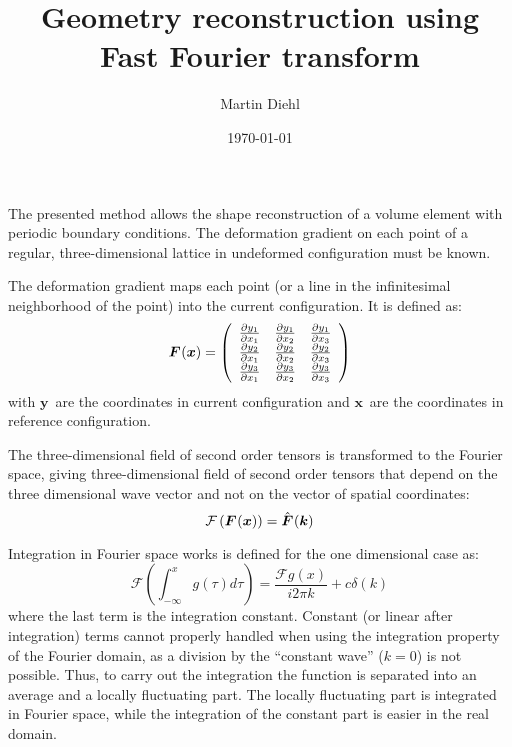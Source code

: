 \documentclass[a4paper,12pt]{article}
\title{Geometry reconstruction using Fast Fourier transform}
\date{\today}
\author{Martin Diehl}
\newcommand{\tnsr}[1]{\ensuremath{\bm{{#1}}}}
\newcommand{\vctr}[1]{\ensuremath{\bm{#1}}}
\newcommand{\F}[1][]{\ensuremath{\tnsr F^{{\rm #1}}}}
\begin{document}
\maketitle

The presented method allows the shape reconstruction of a volume element with periodic boundary conditions.
The deformation gradient on each point of a regular, three-dimensional lattice in undeformed configuration must be known.

The deformation gradient maps each point (or a line in the infinitesimal neighborhood of the point) into the current configuration.
It is defined as:
\begin{equation}
\F(\vctr x) = \left(
   \begin{array}{ccc}
     \frac{\partial y_1}{\partial x_1} & \frac{\partial y_1}{\partial x_2} & \frac{\partial y_1}{\partial x_3} \\
     \frac{\partial y_2}{\partial x_1} & \frac{\partial y_2}{\partial x_2} & \frac{\partial y_2}{\partial x_3} \\
     \frac{\partial y_3}{\partial x_1} & \frac{\partial y_3}{\partial x_2} & \frac{\partial y_3}{\partial x_3} \\
   \end{array}
\right)
\end{equation}
with \vctr y\ are the coordinates in current configuration and \vctr x\ are the coordinates in reference configuration.

The three-dimensional field of second order tensors is transformed to the Fourier space, giving three-dimensional field of second order tensors that depend on the three dimensional wave vector and not on the vector of spatial coordinates:
\begin{equation}
\mathcal F \left( \F(\vctr x) \right)=  \hat{\F}(\vctr k)
\end{equation}

Integration in Fourier space works is defined for the one dimensional case as:
\begin{equation}
\mathcal{F} \left( \int_{-\infty}^{x} g (\tau) d \tau \right) = \frac{\mathcal{F}{g(x)}}{i2 \pi k} + c \delta(k)
\end{equation}
where the last term is the integration constant.
Constant (or linear after integration) terms cannot properly handled when using the integration property of the Fourier domain, as a division by the ``constant wave'' ($k=0$) is not possible.
Thus, to carry out the integration the function is separated into an average and a locally fluctuating part.
The locally fluctuating part is integrated in Fourier space, while the integration of the constant part is easier in the real domain.
\end{document}
